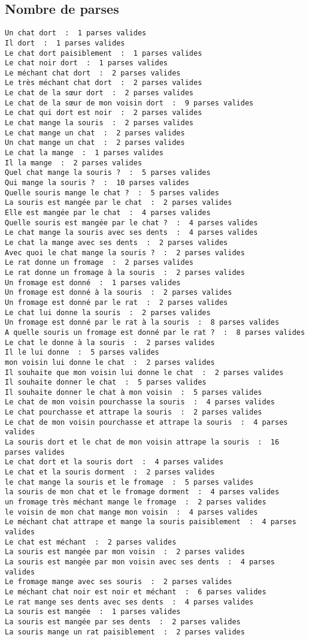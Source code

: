 \documentclass[12pt]{article}
\theoremstyle{exostyle}
\begin{document}
\subsection{Nombre de parses}
\begin{verbatim}
Un chat dort  :  1 parses valides
Il dort  :  1 parses valides
Le chat dort paisiblement  :  1 parses valides
Le chat noir dort  :  1 parses valides
Le méchant chat dort  :  2 parses valides
Le très méchant chat dort  :  2 parses valides
Le chat de la sœur dort  :  2 parses valides
Le chat de la sœur de mon voisin dort  :  9 parses valides
Le chat qui dort est noir  :  2 parses valides
Le chat mange la souris  :  2 parses valides
Le chat mange un chat  :  2 parses valides
Un chat mange un chat  :  2 parses valides
Le chat la mange  :  1 parses valides
Il la mange  :  2 parses valides
Quel chat mange la souris ?  :  5 parses valides
Qui mange la souris ?  :  10 parses valides
Quelle souris mange le chat ?  :  5 parses valides
La souris est mangée par le chat  :  2 parses valides
Elle est mangée par le chat  :  4 parses valides
Quelle souris est mangée par le chat ?  :  4 parses valides
Le chat mange la souris avec ses dents  :  4 parses valides
Le chat la mange avec ses dents  :  2 parses valides
Avec quoi le chat mange la souris ?  :  2 parses valides
Le rat donne un fromage  :  2 parses valides
Le rat donne un fromage à la souris  :  2 parses valides
Un fromage est donné  :  1 parses valides
Un fromage est donné à la souris  :  2 parses valides
Un fromage est donné par le rat  :  2 parses valides
Le chat lui donne la souris  :  2 parses valides
Un fromage est donné par le rat à la souris  :  8 parses valides
A quelle souris un fromage est donné par le rat ?  :  8 parses valides
Le chat le donne à la souris  :  2 parses valides
Il le lui donne  :  5 parses valides
mon voisin lui donne le chat  :  2 parses valides
Il souhaite que mon voisin lui donne le chat  :  2 parses valides
Il souhaite donner le chat  :  5 parses valides
Il souhaite donner le chat à mon voisin  :  5 parses valides
Le chat de mon voisin pourchasse la souris  :  4 parses valides
Le chat pourchasse et attrape la souris  :  2 parses valides
Le chat de mon voisin pourchasse et attrape la souris  :  4 parses valides
La souris dort et le chat de mon voisin attrape la souris  :  16 parses valides
Le chat dort et la souris dort  :  4 parses valides
Le chat et la souris dorment  :  2 parses valides
le chat mange la souris et le fromage  :  5 parses valides
la souris de mon chat et le fromage dorment  :  4 parses valides
un fromage très méchant mange le fromage  :  2 parses valides
le voisin de mon chat mange mon voisin  :  4 parses valides
Le méchant chat attrape et mange la souris paisiblement  :  4 parses valides
Le chat est méchant  :  2 parses valides
La souris est mangée par mon voisin  :  2 parses valides
La souris est mangée par mon voisin avec ses dents  :  4 parses valides
Le fromage mange avec ses souris  :  2 parses valides
Le méchant chat noir est noir et méchant  :  6 parses valides
Le rat mange ses dents avec ses dents  :  4 parses valides
La souris est mangée  :  1 parses valides
La souris est mangée par ses dents  :  2 parses valides
La souris mange un rat paisiblement  :  2 parses valides
\end{verbatim}
\end{document}
